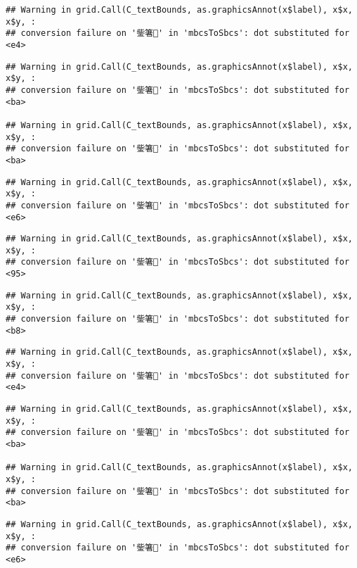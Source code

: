 \documentclass[
]{article}
\begin{document}
\begin{verbatim}
## Warning in grid.Call(C_textBounds, as.graphicsAnnot(x$label), x$x, x$y, :
## conversion failure on '鈭箸' in 'mbcsToSbcs': dot substituted for <e4>
\end{verbatim}

\begin{verbatim}
## Warning in grid.Call(C_textBounds, as.graphicsAnnot(x$label), x$x, x$y, :
## conversion failure on '鈭箸' in 'mbcsToSbcs': dot substituted for <ba>

## Warning in grid.Call(C_textBounds, as.graphicsAnnot(x$label), x$x, x$y, :
## conversion failure on '鈭箸' in 'mbcsToSbcs': dot substituted for <ba>
\end{verbatim}

\begin{verbatim}
## Warning in grid.Call(C_textBounds, as.graphicsAnnot(x$label), x$x, x$y, :
## conversion failure on '鈭箸' in 'mbcsToSbcs': dot substituted for <e6>
\end{verbatim}

\begin{verbatim}
## Warning in grid.Call(C_textBounds, as.graphicsAnnot(x$label), x$x, x$y, :
## conversion failure on '鈭箸' in 'mbcsToSbcs': dot substituted for <95>
\end{verbatim}

\begin{verbatim}
## Warning in grid.Call(C_textBounds, as.graphicsAnnot(x$label), x$x, x$y, :
## conversion failure on '鈭箸' in 'mbcsToSbcs': dot substituted for <b8>
\end{verbatim}

\begin{verbatim}
## Warning in grid.Call(C_textBounds, as.graphicsAnnot(x$label), x$x, x$y, :
## conversion failure on '鈭箸' in 'mbcsToSbcs': dot substituted for <e4>
\end{verbatim}

\begin{verbatim}
## Warning in grid.Call(C_textBounds, as.graphicsAnnot(x$label), x$x, x$y, :
## conversion failure on '鈭箸' in 'mbcsToSbcs': dot substituted for <ba>

## Warning in grid.Call(C_textBounds, as.graphicsAnnot(x$label), x$x, x$y, :
## conversion failure on '鈭箸' in 'mbcsToSbcs': dot substituted for <ba>
\end{verbatim}

\begin{verbatim}
## Warning in grid.Call(C_textBounds, as.graphicsAnnot(x$label), x$x, x$y, :
## conversion failure on '鈭箸' in 'mbcsToSbcs': dot substituted for <e6>
\end{verbatim}
\end{document}
